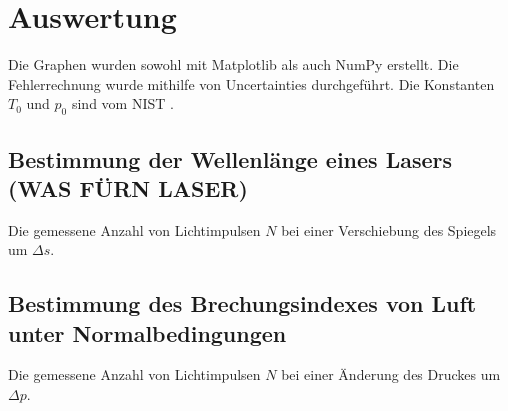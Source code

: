 \section{Auswertung}
\label{sec:Auswertung}


Die Graphen wurden sowohl mit Matplotlib \cite{matplotlib} als auch NumPy \cite{numpy} erstellt. Die
Fehlerrechnung wurde mithilfe von Uncertainties \cite{uncertainties} durchgeführt.
Die Konstanten $T_0$ und $p_0$ sind vom NIST \cite{nistgov}.

\subsection{Bestimmung der Wellenlänge eines Lasers (WAS FÜRN LASER)}
\begin{table}
	\centering
	\caption{Die gemessene Anzahl von Lichtimpulsen $N$ bei einer Verschiebung des Spiegels um $\Delta s$.}
	
	\label{tab:a}
\end{table}

\subsection{Bestimmung des Brechungsindexes von Luft unter Normalbedingungen}
\begin{table}
	\centering
	\caption{Die gemessene Anzahl von Lichtimpulsen $N$ bei einer Änderung des Druckes um $\Delta p$.}
	
	\label{tab:b}
\end{table}

